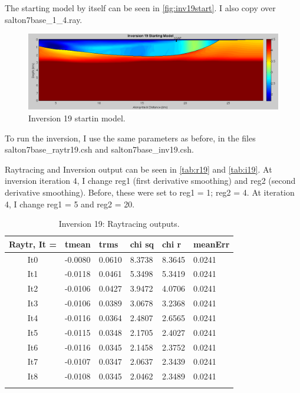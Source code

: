 \documentclass[fontsize=11pt, %
                             paper=a4, %
                             twoside, %
                             captions=tableheading,
                             index=totoc,
                             hyperref]{labbook}
\begin{document}
\begin{addmargin}[4cm]{0cm}
The starting model by itself can be seen in \autoref{fig:inv19start}.  I also copy over salton7base\_1\_4.ray.  

\begin{figure}[h!]
\raggedleft
\includegraphics[scale=0.4,keepaspectratio=true]{figs/Inv19start.png}
\caption{Inversion 19 startin model.}
\label{fig:inv19start}
\end{figure} 

To run the inversion, I use the same parameters as before, in the files salton7base\_raytr19.csh and salton7base\_inv19.csh.

\clearpage{}

Raytracing and Inversion output can be seen in \autoref{tab:r19} and \autoref{tab:i19}.
At inversion iteration 4, I change reg1 (first derivative smoothing) and reg2 (second derivative smoothing).  Before, these were set to reg1 = 1; reg2 = 4.  At iteration 4, I change reg1 = 5 and reg2 = 20.  

\begin{table}[!ht]
\label{tab:r19}
\raggedleft
\begin{tabular}{c l l l l l}
\toprule
\textbf{Raytr, It = } & \textbf{tmean} & \textbf{trms} & \textbf{chi sq} & \textbf{chi r} & \textbf{meanErr} \\
\toprule
It0 & -0.0080 & 0.0610 & 8.3738 & 8.3645 & 0.0241\\
It1 & -0.0118 & 0.0461 & 5.3498 & 5.3419 & 0.0241\\
It2 & -0.0106 & 0.0427 & 3.9472 & 4.0706 & 0.0241\\
It3 & -0.0106 & 0.0389 & 3.0678 & 3.2368 & 0.0241\\
It4 & -0.0116 & 0.0364 & 2.4807 & 2.6565 & 0.0241\\
It5 & -0.0115 & 0.0348 & 2.1705 & 2.4027 & 0.0241\\ 
It6 & -0.0116 & 0.0345 & 2.1458 & 2.3752 & 0.0241\\
It7 & -0.0107 & 0.0347 & 2.0637 & 2.3439 & 0.0241\\
It8 & -0.0108 & 0.0345 & 2.0462 & 2.3489 & 0.0241\\
\bottomrule\\
\end{tabular}
\caption{Inversion 19: Raytracing outputs.}
\end{table}


\end{addmargin}
\end{document}
